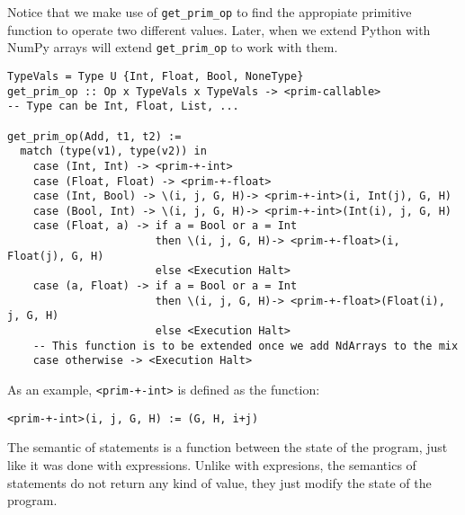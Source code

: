 Notice that we make use of \texttt{get\_prim\_op} to find the appropiate
primitive function to operate two different values. Later, when we
extend Python with NumPy arrays will extend \texttt{get\_prim\_op} to
work with them.

\begin{verbatim}
TypeVals = Type U {Int, Float, Bool, NoneType}
get_prim_op :: Op x TypeVals x TypeVals -> <prim-callable>
-- Type can be Int, Float, List, ...

get_prim_op(Add, t1, t2) :=
  match (type(v1), type(v2)) in
    case (Int, Int) -> <prim-+-int>
    case (Float, Float) -> <prim-+-float>
    case (Int, Bool) -> \(i, j, G, H)-> <prim-+-int>(i, Int(j), G, H)
    case (Bool, Int) -> \(i, j, G, H)-> <prim-+-int>(Int(i), j, G, H)
    case (Float, a) -> if a = Bool or a = Int
                       then \(i, j, G, H)-> <prim-+-float>(i, Float(j), G, H)
                       else <Execution Halt>
    case (a, Float) -> if a = Bool or a = Int
                       then \(i, j, G, H)-> <prim-+-float>(Float(i), j, G, H)
                       else <Execution Halt>
    -- This function is to be extended once we add NdArrays to the mix
    case otherwise -> <Execution Halt>
\end{verbatim}

As an example, \texttt{\textless{}prim-+-int\textgreater{}} is defined
as the function:

\texttt{\textless{}prim-+-int\textgreater{}(i,\ j,\ G,\ H)\ :=\ (G,\ H,\ i+j)}

{}

The semantic of statements is a function between the state of the
program, just like it was done with expressions. Unlike with expresions,
the semantics of statements do not return any kind of value, they just
modify the state of the program.

